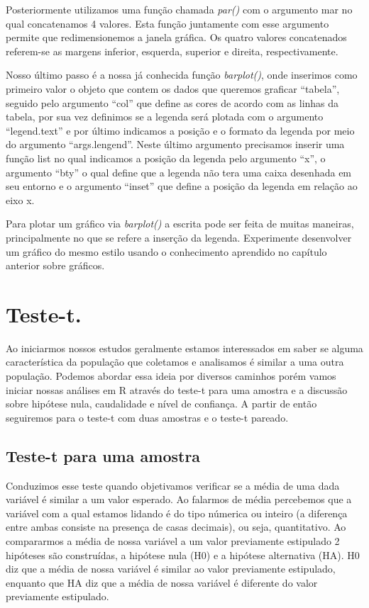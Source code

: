 \documentclass[titlepage, oneside, openany, a4paper]{book}
\begin{document}
Posteriormente utilizamos uma função chamada \emph{par()} com o argumento mar no qual concatenamos 4 valores. Esta função juntamente com esse argumento permite que redimensionemos a janela gráfica. Os quatro valores concatenados referem-se as margens inferior, esquerda, superior e direita, respectivamente.

Nosso último passo é a nossa já conhecida função \emph{barplot()}, onde inserimos como primeiro valor o objeto que contem os dados que queremos graficar ``tabela'', seguido pelo argumento ``col'' que define as cores de acordo com as linhas da tabela, por sua vez definimos se a legenda será plotada com o argumento ``legend.text'' e por último indicamos a posição e o formato da legenda por meio do argumento ``args.lengend''. Neste último argumento precisamos inserir uma função list no qual indicamos a posição da legenda pelo argumento ``x'', o argumento ``bty'' o qual define que a legenda não tera uma caixa desenhada em seu entorno e o argumento ``inset'' que define a posição da legenda em relação ao eixo x.

Para plotar um gráfico via \emph{barplot()} a escrita pode ser feita de muitas maneiras, principalmente no que se refere a inserção da legenda. Experimente desenvolver um gráfico do mesmo estilo usando o conhecimento aprendido no capítulo anterior sobre gráficos.

\hypertarget{teste-t.}{%
\chapter{Teste-t.}\label{teste-t.}}

Ao iniciarmos nossos estudos geralmente estamos interessados em saber se alguma característica da população que coletamos e analisamos é similar a uma outra população. Podemos abordar essa ideia por diversos caminhos porém vamos iniciar nossas análises em R através do teste-t para uma amostra e a discussão sobre hipótese nula, caudalidade e nível de confiança. A partir de então seguiremos para o teste-t com duas amostras e o teste-t pareado.

\hypertarget{teste-t-para-uma-amostra}{%
\section{Teste-t para uma amostra}\label{teste-t-para-uma-amostra}}

Conduzimos esse teste quando objetivamos verificar se a média de uma dada variável é similar a um valor esperado. Ao falarmos de média percebemos que a variável com a qual estamos lidando é do tipo númerica ou inteiro (a diferença entre ambas consiste na presença de casas decimais), ou seja, quantitativo. Ao compararmos a média de nossa variável a um valor previamente estipulado 2 hipóteses são construídas, a hipótese nula (H0) e a hipótese alternativa (HA). H0 diz que a média de nossa variável é similar ao valor previamente estipulado, enquanto que HA diz que a média de nossa variável é diferente do valor previamente estipulado.
\end{document}
